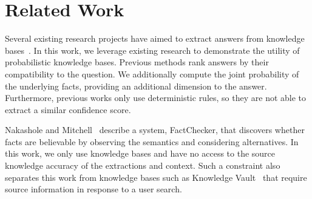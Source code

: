 

\section{Related Work}

Several existing research projects have aimed to extract answers from knowledge bases~\cite{yahya2012natural,yao2014information}.
In this work, we leverage existing research to demonstrate the utility of probabilistic knowledge bases.
Previous methods rank answers by their compatibility to the question.
We additionally compute the joint probability of the underlying facts, providing an additional dimension to the answer.
Furthermore, previous works only use deterministic rules, so they are not able to extract a similar confidence score.

Nakashole and Mitchell~\cite{nakashole2014languageaware} describe a system,
FactChecker, that discovers whether facts are believable by observing the
semantics and considering alternatives. 
In this work, we only use knowledge bases and have no access to the source
knowledge accuracy of the extractions and context.
Such a constraint also separates this work from knowledge bases such as
Knowledge Vault~\cite{dong2014knowledge} that require source information in
response to a user search.

